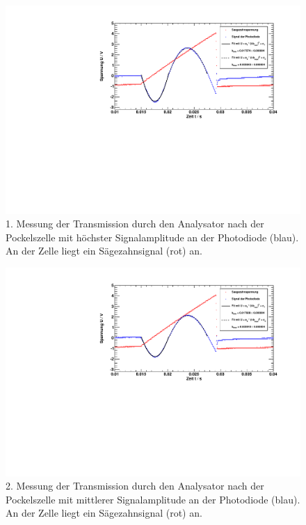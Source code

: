 \begin{figure}[H]
\begin{center}
  \includegraphics[width=15cm]{../img/pock_saege_winkel1.pdf}
  \caption{1. Messung der Transmission durch den Analysator nach der Pockelszelle mit höchster Signalamplitude
  an der Photodiode (blau). An der Zelle liegt ein Sägezahnsignal (rot) an.}
  \label{img:pock_saege_winkel1}
\end{center}
\end{figure}

\begin{figure}[H]
\begin{center}
  \includegraphics[width=15cm]{../img/pock_saege_winkel2.pdf}
  \caption{2. Messung der Transmission durch den Analysator nach der Pockelszelle mit mittlerer Signalamplitude
  an der Photodiode (blau). An der Zelle liegt ein Sägezahnsignal (rot) an.}
  \label{img:pock_saege_winkel2}
\end{center}
\end{figure}

